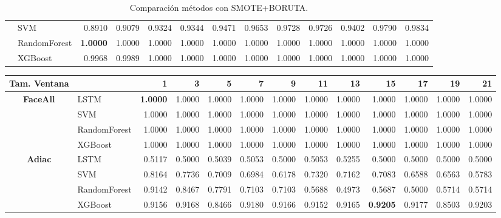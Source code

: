 \begin{table}[h]
\begin{adjustbox}{max width=15cm}
\begin{tabular}{|c|l|r|r|r|r|r|r|r|r|r|r|r|}
	& SVM &  0.8910 &  0.9079 &  0.9324 &  0.9344 &  0.9471 &  0.9653 &  0.9728 &  0.9726 &  0.9402 &  0.9790 &  0.9834 \\
	& RandomForest &  \textbf{1.0000} &  1.0000 &  1.0000 &  1.0000 &  1.0000 &  1.0000 &  1.0000 &  1.0000 &  1.0000 &  1.0000 &  1.0000 \\
	& XGBoost &  0.9968 &  0.9989 &  1.0000 &  1.0000 &  1.0000 &  1.0000 &  1.0000 &  1.0000 &  1.0000 &  1.0000 &  1.0000 \\
	\hline
\end{tabular}
\end{adjustbox}
\caption{Comparación métodos con SMOTE+BORUTA.}
\label{tab:all_comp_smote_boruta}
\end{table}


\begin{table}[h]
\centering
\begin{adjustbox}{max width=15cm}
\begin{tabular}{|c|l|r|r|r|r|r|r|r|r|r|r|r|}
		\hline
		\textbf{Tam. Ventana}&         &      1  &      3  &      5  &      7  &      9  &      11 &      13 &      15 &      17 &      19 &      21 \\
		\hline
		\textbf{FaceAll} & LSTM &  \textbf{1.0000} &  1.0000 &  1.0000 &  1.0000 &  1.0000 &  1.0000 &  1.0000 &  1.0000 &  1.0000 &  1.0000 &  1.0000 \\
		& SVM &  1.0000 &  1.0000 &  1.0000 &  1.0000 &  1.0000 &  1.0000 &  1.0000 &  1.0000 &  1.0000 &  1.0000 &  1.0000 \\
		& RandomForest &  1.0000 &  1.0000 &  1.0000 &  1.0000 &  1.0000 &  1.0000 &  1.0000 &  1.0000 &  1.0000 &  1.0000 &  1.0000 \\
		& XGBoost &  1.0000 &  1.0000 &  1.0000 &  1.0000 &  1.0000 &  1.0000 &  1.0000 &  1.0000 &  1.0000 &  1.0000 &  1.0000 \\
		\hline
		\textbf{Adiac} & LSTM &  0.5117 &  0.5000 &  0.5039 &  0.5053 &  0.5000 &  0.5053 &  0.5255 &  0.5000 &  0.5000 &  0.5000 &  0.5000 \\
		& SVM &  0.8164 &  0.7736 &  0.7009 &  0.6984 &  0.6178 &  0.7320 &  0.7162 &  0.7083 &  0.6588 &  0.6563 &  0.5783 \\
		& RandomForest &  0.9142 &  0.8467 &  0.7791 &  0.7103 &  0.7103 &  0.5688 &  0.4973 &  0.5687 &  0.5000 &  0.5714 &  0.5714 \\
		& XGBoost &  0.9156 &  0.9168 &  0.8466 &  0.9180 &  0.9166 &  0.9152 &  0.9165 &  \textbf{0.9205} &  0.9177 &  0.8503 &  0.9203 \\

\end{tabular}
\end{adjustbox}
\end{table}
